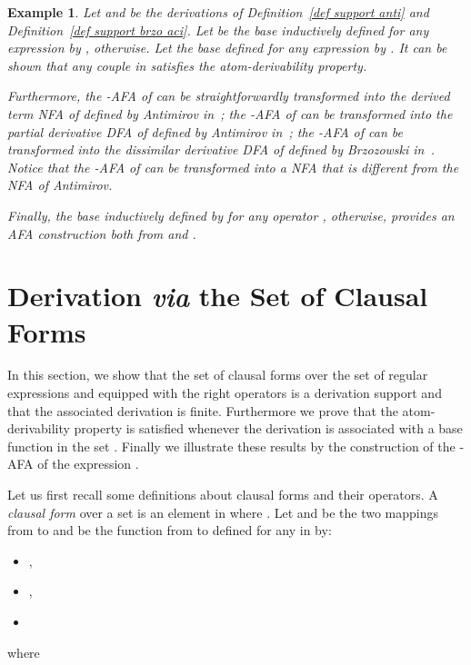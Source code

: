 \documentclass{article}
\newtheorem{example}{Example}
\begin{document}
   \begin{example}
    Let  and  be the derivations of Definition~\ref{def support anti} and Definition~\ref{def support brzo aci}.
    Let  be the base inductively defined for any expression by  ,  otherwise.
    Let  the base defined for any expression by .
    It can be shown that any couple in  satisfies the atom-derivability property.
    
    Furthermore, the -AFA of  can be straightforwardly transformed into the 
derived
    term NFA of  defined by Antimirov in~\cite{Ant96}; the -AFA of  can be transformed into the partial derivative DFA of  defined by Antimirov in~\cite{Ant96};  the -AFA of  can be transformed into the dissimilar derivative DFA of  defined by Brzozowski in~\cite{Brz64}. Notice that the -AFA of  can be transformed into a NFA that is different from the NFA of Antimirov.
    
    Finally, the base  inductively defined by   for any operator ,  otherwise, provides an AFA construction both from  and .
  \end{example}

  \section{Derivation \emph{via} the Set of Clausal Forms}\label{sec deriv via set clausal form}
    
    In this section, we show that the set of clausal forms over the set of regular expressions and equipped with the right operators is a derivation support and that the associated  derivation is finite. Furthermore we prove that the atom-derivability property is satisfied whenever the  derivation is associated with a base function in the set . Finally we illustrate these results by the construction of the -AFA of the expression .
    
    \medskip
    
    Let us first recall some definitions about clausal forms and their operators.  
  A \emph{clausal form} over a set  is an element in  where . Let  and  be the two mappings from  to  and  be the function from   to  defined for any  in  by:
  
  \begin{itemize}
    \item ,
    \item , 
    \item     
  \end{itemize}
  
  where 
  
\end{document}
